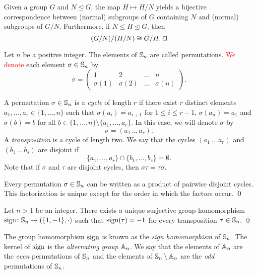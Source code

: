 \begin{theorem} 
Given a group $G$ and $N\unlhd G$, 
the map $H\mapsto H/N$ yields 
a bijective correspondence between (normal) 
subgroups of $G$ containing $N$ and (normal) subgroups of $G/N$. 
Furthermore, if $N\leq H\unlhd G$, then
\[
(G/N)/(H/N)\cong G/H.\;\qed
\]
\end{theorem}

Let $n$ be a positive integer. The elements of $\mathbb{S}_n$ are called permutations. 
\textcolor{red}{We denote} each element $\sigma\in\mathbb{S}_n$ by
\[ 
\sigma=\left(\begin{array}{cccc}
1&2&\ldots&n\\
\sigma(1)&\sigma(2)&\ldots&\sigma(n)\end{array}\right).
\]


A permutation $\sigma\in \mathbb{S}_n$ is a {\em cycle} of length $r$ 
if there exist $r$ distinct elements 
$a_1,\dots ,a_r\in\{ 1,\dots, n\}$ such that $\sigma(a_i)=a_{i+1}$ for $1\leq i\leq r-1$, $\sigma(a_n)=a_1$ and $\sigma(b)=b$ 
for all $b\in \{1,\dots, n\}\setminus\{ a_1,\dots ,a_r\}$. In this case, we will denote $\sigma$ by
\[ 
\sigma=(a_1\,\dots\, a_r).
\]
A {\em transposition} is a cycle of length two. 
We say that the cycles
$(a_1\,\dots\, a_r)$ and $(b_1\,\dots\, b_s)$ are disjoint if 
\[
\{ a_1,\dots, a_r\}\cap \{ b_1,\dots, b_s\}=\emptyset.
\]
Note that if $\sigma$ and $\tau$ are disjoint cycles, then $\sigma\tau=\tau\sigma$.

\begin{theorem}
        Every permutation $\sigma\in\mathbb{S}_n$ can be written as a product of pairwise disjoint cycles.
        This factorization is unique except for the order in which the factors occur. \qed
\end{theorem}

\begin{theorem}
    Let $n>1$ be an integer. There exists a unique surjective group homomorphism 
    \textcolor{red}{$\operatorname{sign}\colon \mathbb{S}_n\rightarrow (\{ 1,-1\} ,\cdot)$}
    such that $\operatorname{sign}(\tau)=-1$ for every transposition $\tau\in\mathbb{S}_n$. \qed
\end{theorem}


The group homomorphism $\operatorname{sign}$ is known as the {\em sign homomorphism} of $\mathbb{S}_n$. 
The kernel of $\operatorname{sign}$ is the {\em alternating group} $\mathbb{A}_n$.
We say that the elements of $\mathbb{A}_n$ are the {\em even} permutations of $\mathbb{S}_n$ 
and the elements of $\mathbb{S}_n\setminus\mathbb{A}_n$
are the {\em odd} permutations of $\mathbb{S}_n$.

